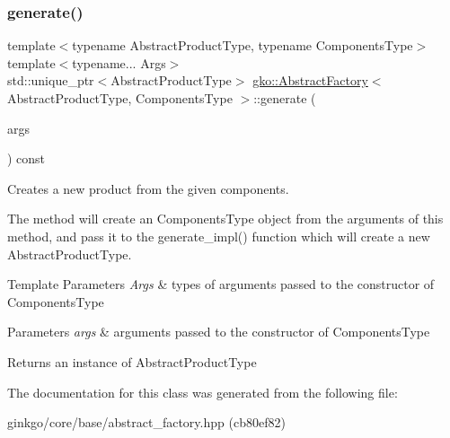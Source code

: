 \subsubsection{\texorpdfstring{generate()}{generate()}}
{\footnotesize\ttfamily template$<$typename Abstract\+Product\+Type, typename Components\+Type$>$ \\
template$<$typename... Args$>$ \\
std\+::unique\+\_\+ptr$<$Abstract\+Product\+Type$>$ \hyperlink{classgko_1_1AbstractFactory}{gko\+::\+Abstract\+Factory}$<$ Abstract\+Product\+Type, Components\+Type $>$\+::generate (\begin{DoxyParamCaption}\item[{Args \&\&...}]{args }\end{DoxyParamCaption}) const\hspace{0.3cm}{\ttfamily [inline]}}



Creates a new product from the given components. 

The method will create an Components\+Type object from the arguments of this method, and pass it to the generate\+\_\+impl() function which will create a new Abstract\+Product\+Type.


\begin{DoxyTemplParams}{Template Parameters}
{\em Args} & types of arguments passed to the constructor of Components\+Type\\
\hline
\end{DoxyTemplParams}

\begin{DoxyParams}{Parameters}
{\em args} & arguments passed to the constructor of Components\+Type\\
\hline
\end{DoxyParams}
\begin{DoxyReturn}{Returns}
an instance of Abstract\+Product\+Type 
\end{DoxyReturn}


The documentation for this class was generated from the following file\+:\begin{DoxyCompactItemize}
\item 
ginkgo/core/base/abstract\+\_\+factory.\+hpp (cb80ef82)\end{DoxyCompactItemize}
